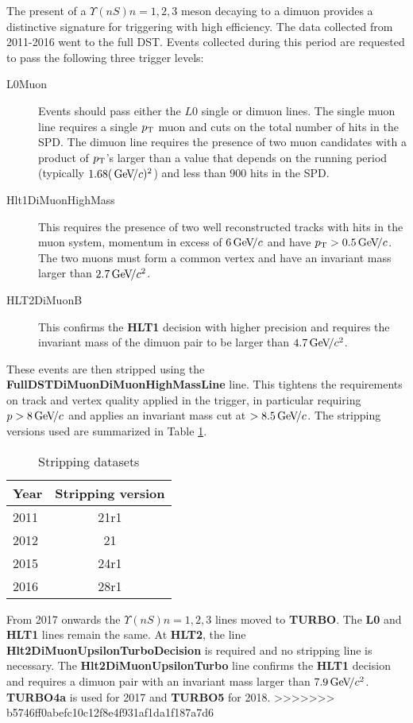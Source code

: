 The present of a $\Upsilon(nS) n = 1,2,3$ meson decaying to a dimuon
provides a distinctive signature for triggering with high efficiency. The data collected
from 2011-2016 went to the full DST. Events collected during this
period are requested to pass the following three trigger levels:
\begin{description}
\item[L0Muon] Events should pass either the $L0$ single or dimuon
  lines. The single muon line requires a single $p_{\mathrm{T}}$ muon and cuts on
  the total number of hits in the SPD. The dimuon line requires the presence of two muon candidates
  with a product of $p_{\mathrm{T}}$'s larger than a value that depends on the
  running period (typically $1.68 (\text{\,Ge\kern -0.1em V\!/}c)^2$) and less than 900 hits
  in the SPD.
\item[Hlt1DiMuonHighMass] This requires the presence of two well
  reconstructed tracks with hits in the muon system, momentum in
  excess of $6 \text{\,Ge\kern -0.1em V\!/}c$ and have $p_{\mathrm{T}} > 0.5 \text{\,Ge\kern -0.1em V\!/}c$. The two muons must
  form a common vertex and have an invariant mass larger than $2.7
  \text{\,Ge\kern -0.1em V\!/}c^2$. 
\item[HLT2DiMuonB] This confirms the \textbf{HLT1} decision with higher precision and requires
the invariant mass of the dimuon pair to be larger than  $4.7
  \text{\,Ge\kern -0.1em V\!/}c^2$. 
\end{description}
These events are then stripped using the
\textbf{FullDSTDiMuonDiMuonHighMassLine} line. This tightens the
requirements on track and vertex quality applied in the trigger, in
particular requiring $p > 8 \text{\,Ge\kern -0.1em V\!/}c$ and applies an invariant mass cut
at $> 8.5 \text{\,Ge\kern -0.1em V\!/}c$. The stripping versions used are summarized in Table \ref{tab:strip}. 

\begin{table}[htb!]
\caption{\small Stripping datasets }
\begin{center}
\begin{tabular}{l|c}
Year & Stripping version  \\
\hline
2011 & 21r1 \\
2012 & 21 \\
2015 & 24r1 \\
2016 & 28r1 \\
\end{tabular}
\end{center}
\label{tab:strip}
\end{table}

From 2017 onwards the $\Upsilon(nS) n = 1,2,3$ lines moved to
\textbf{TURBO}. The  \textbf{L0} and \textbf{HLT1} lines remain the
same. At \textbf{HLT2}, the line
\textbf{Hlt2DiMuonUpsilonTurboDecision} is required and no stripping
line is necessary. The \textbf{Hlt2DiMuonUpsilonTurbo} line confirms
the \textbf{HLT1} decision and requires a dimuon pair with an invariant mass larger than $7.9
  \text{\,Ge\kern -0.1em V\!/}c^2$. \textbf{TURBO4a} is used for 2017 and \textbf{TURBO5} for 2018.
>>>>>>> b5746ff0abefc10c12f8e4f931af1da1f187a7d6
